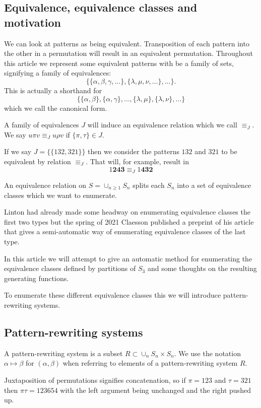 \documentclass[openany, a4paper, 11pt, english]{article}
\newcommand{\patternrule}{ \mapsto \!}
\theoremstyle{definition}
\newcommand{\Sym}{S}
\begin{document}
\subsection{Equivalence, equivalence classes and motivation}
We can look at patterns as being equivalent. Transposition of each pattern into
the other in a permutation will result in an equivalent permutation. Throughout
this article we represent some equivalent patterns with be a family of sets, signifying
a family of equivalences:
\[
    \{ \{\alpha, \beta, \gamma, \dots \}, \{\lambda, \mu, \nu, \dots \}, \dots
    \}.
\]
This is actually a shorthand for
\[
    \{ \{ \alpha, \beta \}, \{ \alpha, \gamma \}, \dots, \{ \lambda, \mu \}, \{
        \lambda, \nu \}, \dots \}
\]
which we call the canonical form.

A family of equivalences $J$ will induce an equivalence relation which we call $\equiv_J$. We
say $u \pi v \equiv_J u \rho v$ if $\{ \pi, \tau \} \in J$.

If we say $J = \{ \{ 132, 321 \} \}$ then we consider the patterns $132$ and $321$ to
be equivalent by relation $\equiv_J$. That will, for example, result in
\[
    1\bm{243} \equiv_J 1\bm{432}
\]

An equivalence relation on $\Sym = \cup_{n \geq 1} \Sym_n$ splits each $\Sym_n$
into a set of equivalence classes which we want to enumerate. 

Linton had already made some headway on enumerating equivalence classes the
first two types but the spring of 2021 Claesson published a preprint of his
article that gives a semi-automatic way of enumerating equivalence classes of
the last type.

In this article we will attempt to give an automatic method for enumerating the
equivalence classes defined by partitions of $\Sym_3$ and some thoughts on the
resulting generating functions.

To enumerate these different equivalence classes this we will introduce
pattern-rewriting systems.

\subsection{Pattern-rewriting systems}
A pattern-rewriting system is a subset $R \subset \cup_{n} \Sym_n \times \Sym_n$.
We use the notation $\alpha \patternrule \beta$ for $(\alpha, \beta)$ when referring
to elements of a pattern-rewriting system $R$. 

Juxtaposition of permutations signifies concatenation, so if $\pi=123$ and
$\tau=321$ then $\pi\tau=123654$ with the left argument being unchanged and the
right pushed up.
\end{document}
